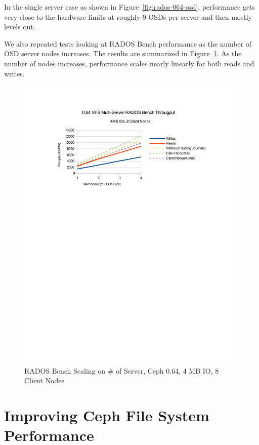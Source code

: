 \documentclass{article}
\begin{document}
In the single server case as shown in Figure~\ref{fig:rados-064-osd},
performance gets very close to the hardware limits at roughly 9 OSDs per server
and then mostly levels out.

We also repeated tests looking at RADOS Bench performance as the
number of OSD server nodes increases. The results are summarized in
Figure~\ref{fig:rados-064-oss}. As the number of nodes increases, performance
scales nearly linearly for both reads and writes.


\begin{figure}[htb]
\centering
\includegraphics[width=5in]{rados-064-oss}
\caption{RADOS Bench Scaling on \# of Server, Ceph 0.64, 4 MB IO, 8 Client Nodes}
\label{fig:rados-064-oss}
\end{figure}



\section{Improving Ceph File System Performance}
\end{document}
